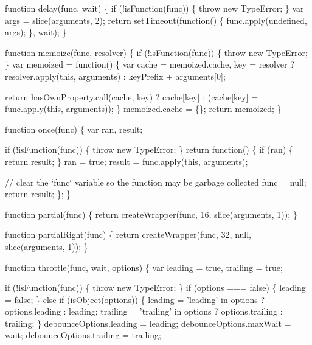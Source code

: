 \begin{DoxyCodeInclude}
    \textcolor{keyword}{function} delay(func, wait) \{
      \textcolor{keywordflow}{if} (!isFunction(func)) \{
        \textcolor{keywordflow}{throw} \textcolor{keyword}{new} TypeError;
      \}
      var args = slice(arguments, 2);
      \textcolor{keywordflow}{return} setTimeout(\textcolor{keyword}{function}() \{ func.apply(undefined, args); \}, wait);
    \}

    \textcolor{keyword}{function} memoize(func, resolver) \{
      \textcolor{keywordflow}{if} (!isFunction(func)) \{
        \textcolor{keywordflow}{throw} \textcolor{keyword}{new} TypeError;
      \}
      var memoized = \textcolor{keyword}{function}() \{
        var cache = memoized.cache,
            key = resolver ? resolver.apply(\textcolor{keyword}{this}, arguments) : keyPrefix + arguments[0];

        \textcolor{keywordflow}{return} hasOwnProperty.call(cache, key)
          ? cache[key]
          : (cache[key] = func.apply(\textcolor{keyword}{this}, arguments));
      \}
      memoized.cache = \{\};
      \textcolor{keywordflow}{return} memoized;
    \}

    \textcolor{keyword}{function} once(func) \{
      var ran,
          result;

      \textcolor{keywordflow}{if} (!isFunction(func)) \{
        \textcolor{keywordflow}{throw} \textcolor{keyword}{new} TypeError;
      \}
      \textcolor{keywordflow}{return} \textcolor{keyword}{function}() \{
        \textcolor{keywordflow}{if} (ran) \{
          \textcolor{keywordflow}{return} result;
        \}
        ran = \textcolor{keyword}{true};
        result = func.apply(\textcolor{keyword}{this}, arguments);

        \textcolor{comment}{// clear the `func` variable so the function may be garbage collected}
        func = null;
        \textcolor{keywordflow}{return} result;
      \};
    \}

    \textcolor{keyword}{function} partial(func) \{
      \textcolor{keywordflow}{return} createWrapper(func, 16, slice(arguments, 1));
    \}

    \textcolor{keyword}{function} partialRight(func) \{
      \textcolor{keywordflow}{return} createWrapper(func, 32, null, slice(arguments, 1));
    \}

    \textcolor{keyword}{function} throttle(func, wait, options) \{
      var leading = \textcolor{keyword}{true},
          trailing = \textcolor{keyword}{true};

      \textcolor{keywordflow}{if} (!isFunction(func)) \{
        \textcolor{keywordflow}{throw} \textcolor{keyword}{new} TypeError;
      \}
      \textcolor{keywordflow}{if} (options === \textcolor{keyword}{false}) \{
        leading = \textcolor{keyword}{false};
      \} \textcolor{keywordflow}{else} \textcolor{keywordflow}{if} (isObject(options)) \{
        leading = \textcolor{stringliteral}{'leading'} in options ? options.leading : leading;
        trailing = \textcolor{stringliteral}{'trailing'} in options ? options.trailing : trailing;
      \}
      debounceOptions.leading = leading;
      debounceOptions.maxWait = wait;
      debounceOptions.trailing = trailing;


\end{DoxyCodeInclude}
